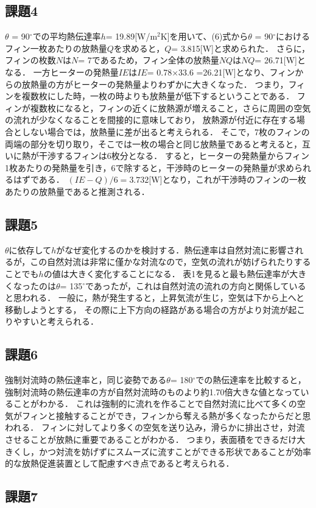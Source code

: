 \documentclass[a4paper,11pt,uplatex]{jsarticle}
\begin{document}
\subsection{課題4}
$\theta$ = 90$^\circ$での平均熱伝達率$h$= 19.89[W/m$^2$K]を用いて、(6)式から$\theta$ = 90$^\circ$におけるフィン一枚あたりの放熱量$Q$を求めると，$Q$= 3.815[W]と求められた．
さらに，フィンの枚数$N$は$N$= 7であるため，フィン全体の放熱量$NQ$は$NQ$= 26.71[W]となる．
一方ヒーターの発熱量$IE$は$IE$= 0.78×33.6 =26.21[W]となり、フィンからの放熱量の方がヒーターの発熱量よりわずかに大きくなった．
つまり，フィンを複数枚にした時，一枚の時よりも放熱量が低下するということである．
フィンが複数枚になると，フィンの近くに放熱源が増えること，さらに周囲の空気の流れが少なくなることを間接的に意味しており，
放熱源が付近に存在する場合としない場合では，放熱量に差が出ると考えられる．
そこで，7枚のフィンの両端の部分を切り取り，そこでは一枚の場合と同じ放熱量であると考えると，互いに熱が干渉するフィンは6枚分となる．
すると，ヒーターの発熱量からフィン1枚あたりの発熱量を引き，6で除すると，干渉時のヒーターの発熱量が求められるはずである．
$(IE - Q)/6= 3.732$[W]となり，これが干渉時のフィンの一枚あたりの放熱量であると推測される．
\subsection{課題5}
$\theta$に依存して$h$がなぜ変化するのかを検討する．熱伝達率は自然対流に影響されるが，この自然対流は非常に僅かな対流なので，空気の流れが妨げられたりすることでも$h$の値は大きく変化することになる．
表1を見ると最も熱伝達率が大きくなったのは$\theta$= 135$^\circ$であったが，これは自然対流の流れの方向と関係していると思われる．
一般に，熱が発生すると，上昇気流が生じ，空気は下から上へと移動しようとする，
その際に上下方向の経路がある場合の方がより対流が起こりやすいと考えられる．
\subsection{課題6}
強制対流時の熱伝達率と，同じ姿勢である$\theta$= 180$^\circ$での熱伝達率を比較すると，強制対流時の熱伝達率の方が自然対流時のものより約1.70倍大きな値となっていることがわかる．
これは強制的に流れを作ることで自然対流に比べて多くの空気がフィンと接触することができ，フィンから奪える熱が多くなったからだと思われる．
フィンに対してより多くの空気を送り込み，滑らかに排出させ，対流させることが放熱に重要であることがわかる．
つまり，表面積をできるだけ大きくし，かつ対流を妨げずにスムーズに流すことができる形状であることが効率的な放熱促進装置として配慮すべき点であると考えられる．
\subsection{課題7}
\end{document}
